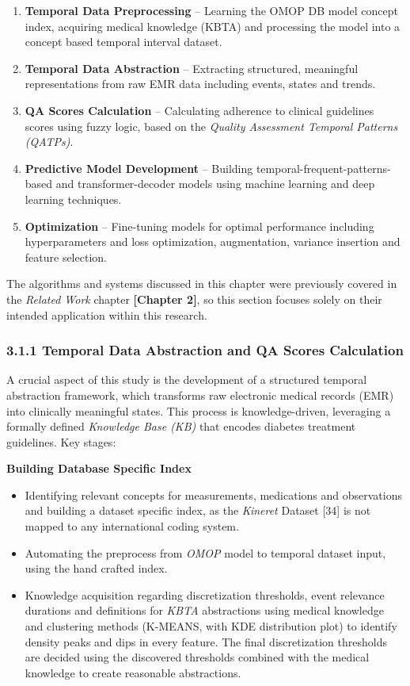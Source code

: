 \documentclass[
]{article}
\begin{document}
\begin{enumerate}
\def\labelenumi{\arabic{enumi}.}
\item
  \textbf{Temporal Data Preprocessing} -- Learning the OMOP DB model
  concept index, acquiring medical knowledge (KBTA) and processing the
  model into a concept based temporal interval dataset.
\item
  \textbf{Temporal Data Abstraction} -- Extracting structured,
  meaningful representations from raw EMR data including events, states
  and trends.
\item
  \textbf{QA Scores Calculation} -- Calculating adherence to clinical
  guidelines scores using fuzzy logic, based on the \emph{Quality
  Assessment Temporal Patterns (QATPs)}.
\item
  \textbf{Predictive Model Development} -- Building
  temporal-frequent-patterns-based and transformer-decoder models using
  machine learning and deep learning techniques.
\item
  \textbf{Optimization} -- Fine-tuning models for optimal performance
  including hyperparameters and loss optimization, augmentation,
  variance insertion and feature selection.
\end{enumerate}

The algorithms and systems discussed in this chapter were previously
covered in the \emph{Related Work} chapter \textbf{{[}Chapter 2{]}}, so
this section focuses solely on their intended application within this
research.

\subsubsection{3.1.1 Temporal Data Abstraction and QA Scores
Calculation}\label{temporal-data-abstraction-and-qa-scores-calculation}

A crucial aspect of this study is the development of a structured
temporal abstraction framework, which transforms raw electronic medical
records (EMR) into clinically meaningful states. This process is
knowledge-driven, leveraging a formally defined \emph{Knowledge Base
(KB)} that encodes diabetes treatment guidelines. Key stages:

\textbf{Building Database Specific Index}

\begin{itemize}
\item
  Identifying relevant concepts for measurements, medications and
  observations and building a dataset specific index, as the
  \emph{Kineret} Dataset {[}34{]} is not mapped to any international
  coding system.
\item
  Automating the preprocess from \emph{OMOP} model to temporal dataset
  input, using the hand crafted index.
\item
  Knowledge acquisition regarding discretization thresholds, event
  relevance durations and definitions for \emph{KBTA} abstractions using
  medical knowledge and clustering methods (K-MEANS, with KDE
  distribution plot) to identify density peaks and dips in every
  feature. The final discretization thresholds are decided using the
  discovered thresholds combined with the medical knowledge to create
  reasonable abstractions.
\end{itemize}
\end{document}
